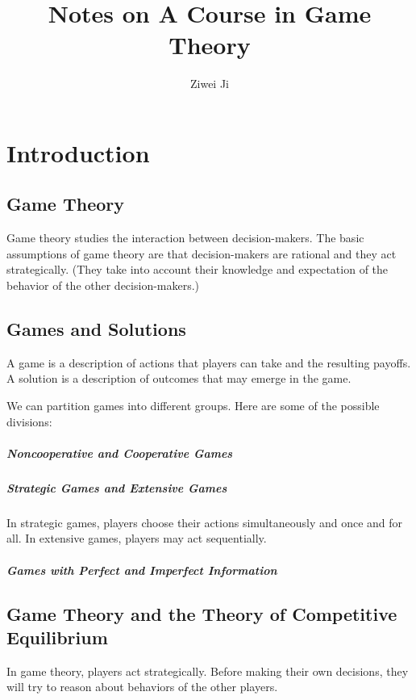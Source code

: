 \documentclass[openany]{book}
\author{Ziwei Ji}
\title{Notes on A Course in Game Theory}
\begin{document}
\maketitle

\chapter{Introduction}
\section{Game Theory}
Game theory studies the interaction between decision-makers. The basic assumptions of game theory are that decision-makers are rational and they act strategically. (They take into account their knowledge and expectation of the behavior of the other decision-makers.)

\section{Games and Solutions}
A game is a description of actions that players can take and the resulting payoffs. A solution is a description of outcomes that may emerge in the game.

We can partition games into different groups. Here are some of the possible divisions:
\paragraph{Noncooperative and Cooperative Games}

\paragraph{Strategic Games and Extensive Games}
In strategic games, players choose their actions simultaneously and once and for all. In extensive games, players may act sequentially.

\paragraph{Games with Perfect and Imperfect Information}

\section{Game Theory and the Theory of Competitive Equilibrium}
In game theory, players act strategically. Before making their own decisions, they will try to reason about behaviors of the other players.
\end{document}
